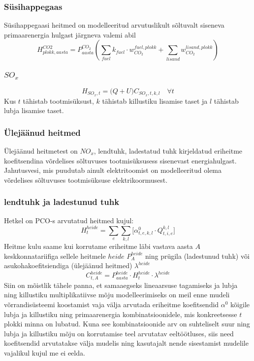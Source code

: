 \documentclass[10pt,a4paper]{article}
\begin{document}
\subsubsection{Süsihappegaas}
Süsihappegaasi heitmed on modelleeritud arvutuslikult sõltuvalt siseneva primaarenergia hulgast järgneva valemi abil
\begin{equation}
H^{CO2}_{plokk, aasta} = P^{CO_2}_{aasta} \left( \sum_{fuel} k_{fuel} \cdot w^{fuel, plokk}_{CO_2} + \sum_{lisand} w^{lisand, plokk}_{CO_2} \right)
\end{equation}

\subsubsection{$SO_x$}
\begin{equation}
H_{SO_x, t} = \big( Q + U \big) C_{SO_x, t, k, l} \quad \forall t
\end{equation}
Kus $t$ tähistab tootmisüksust, $k$ tähistab killustiku lisamise taset ja $l$ tähistab lubja lisamise taset. 

\subsubsection{Ülejäänud heitmed}
Ülejäänud heitmetest on $NO_x$, lendtuhk, ladestatud tuhk kirjeldatud eriheitme koefitsendina võrdelises sõltuvuses tootmisüksusess sisenevast energiahulgast. Jahutusvesi, mis puudutab ainult elektritoomist on modelleeritud olema võrdelises sõltuvuses tootmisüksuse elektrikoormusest.

\subsubsection{lendtuhk ja ladestunud tuhk}
Hetkel on PCO-s arvutatud heitmed kujul:
\begin{equation}
H^{heide}_{t} = \sum_e \sum_{k,l} \bigg[ \alpha^0_{t, e, k,l} \cdot Q^{k,l}_{t,i,e}  \bigg] 
\end{equation}
Heitme kulu saame kui korrutame eriheitme läbi vastava aasta $A$ keskkonnatariifiga sellele heitmele $heide$ $P^{heide}_{A}$ ning prügila (ladestunud tuhk) või asukohakoefitsiendiga (ülejäänud heitmed) $\lambda^{heide}$
\begin{equation}
C^{heide}_{t, A} = P^{heide}_{aasta} \cdot H^{heide}_{t} \cdot \lambda^{heide}
\end{equation}
Siin on mõistlik tähele panna, et samaaegseks lineaarsuse tagamiseks ja lubja ning killustiku multiplikatiivse mõju modelleerimiseks on meil enne mudeli võrrandisüsteemi koostamist vaja välja arvutada eriheitme koefitsendid $\alpha^0$ kõigile lubja ja killustiku ning primaarenergia kombinatsioonidele, mis konkreetsesse $t$ plokki minna on lubatud. Kuna see kombinatsioonide arv on suhteliselt suur ning lubja ja killustiku mõju on korrutamise teel arvutatav eeltöötluses, siis need koefitsendid arvutatakse välja mudelis ning kasutajalt nende sisestamist mudelile vajalikul kujul me ei eelda.
\end{document}
